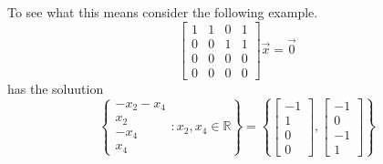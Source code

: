 \documentclass{article}
\begin{document}
        To see what this means consider the following example.
        \[
        \left[
            \begin{array}{cccc}
                1 & 1 & 0 & 1\\
                0 & 0 & 1 & 1\\
                0 & 0 & 0 & 0\\
                0 & 0 & 0 & 0
            \end{array}
        \right] \vec{x} = \vec{0}
        \]
        has the soluution
        \[
        \left\{
            \begin{array}{c}
                -x_2-x_4\\
                x_2\\
                -x_4\\
                x_4
            \end{array} : x_2, x_4 \in \mathbb{R}
            \right\} = \left\{
                \left[
                    \begin{array}{c}
                        -1\\
                        1\\
                        0\\
                        0
                    \end{array}
                    \right],
                    \left[
                        \begin{array}{c}
                            -1\\
                            0\\
                            -1\\
                            1
                        \end{array}
                        \right]
                \right\}
        \]
        
\end{document}
